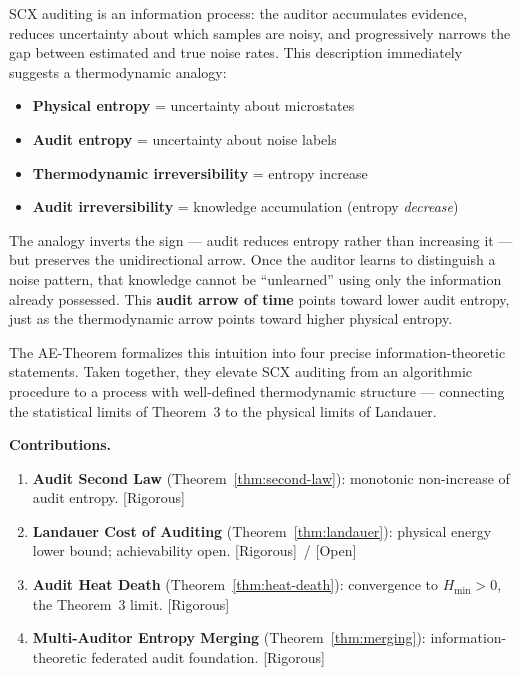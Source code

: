 \documentclass[12pt,a4paper]{article}
\newcommand{\rigorous}{\textcolor{green!50!black}{\small\textsf{[Rigorous]}}}
\newcommand{\openquest}{\textcolor{red!70!black}{\small\textsf{[Open]}}}
\begin{document}
SCX auditing is an information process: the auditor accumulates evidence,
reduces uncertainty about which samples are noisy, and progressively narrows
the gap between estimated and true noise rates.  This description immediately
suggests a thermodynamic analogy:
\begin{itemize}
    \item \textbf{Physical entropy} = uncertainty about microstates
    \item \textbf{Audit entropy} = uncertainty about noise labels
    \item \textbf{Thermodynamic irreversibility} = entropy increase
    \item \textbf{Audit irreversibility} = knowledge accumulation (entropy
          \emph{decrease})
\end{itemize}

The analogy inverts the sign — audit reduces entropy rather than increasing it
— but preserves the unidirectional arrow.  Once the auditor learns to
distinguish a noise pattern, that knowledge cannot be ``unlearned'' using only
the information already possessed.  This \textbf{audit arrow of time} points
toward lower audit entropy, just as the thermodynamic arrow points toward
higher physical entropy.

The AE-Theorem formalizes this intuition into four precise information-theoretic
statements.  Taken together, they elevate SCX auditing from an algorithmic
procedure to a process with well-defined thermodynamic structure — connecting
the statistical limits of Theorem~3 to the physical limits of Landauer.

\medskip\noindent
\textbf{Contributions.}
\begin{enumerate}[label=(\arabic*)]
    \item \textbf{Audit Second Law} (Theorem~\ref{thm:second-law}):
          monotonic non-increase of audit entropy.  \rigorous
    \item \textbf{Landauer Cost of Auditing} (Theorem~\ref{thm:landauer}):
          physical energy lower bound; achievability open.  \rigorous~/ \openquest
    \item \textbf{Audit Heat Death} (Theorem~\ref{thm:heat-death}):
          convergence to $H_{\min}>0$, the Theorem~3 limit.  \rigorous
    \item \textbf{Multi-Auditor Entropy Merging} (Theorem~\ref{thm:merging}):
          information-theoretic federated audit foundation.  \rigorous
\end{enumerate}
\end{document}
